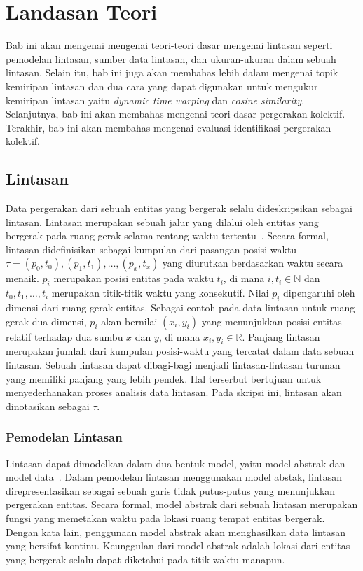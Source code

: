 \chapter{Landasan Teori}
\label{chap:teori}

Bab ini akan mengenai mengenai teori-teori dasar mengenai lintasan seperti pemodelan lintasan, sumber data lintasan, dan ukuran-ukuran dalam sebuah lintasan. Selain itu, bab ini juga akan membahas lebih dalam mengenai topik kemiripan lintasan dan dua cara yang dapat digunakan untuk mengukur kemiripan lintasan yaitu \textit{dynamic time warping} dan \textit{cosine similarity}. Selanjutnya, bab ini akan membahas mengenai teori dasar pergerakan kolektif. Terakhir, bab ini akan membahas mengenai evaluasi identifikasi pergerakan kolektif.

\section{Lintasan}
\label{sec:lintasan}

Data pergerakan dari sebuah entitas yang bergerak selalu dideskripsikan sebagai lintasan. Lintasan merupakan sebuah jalur yang dilalui oleh entitas yang bergerak pada ruang gerak selama rentang waktu tertentu~\cite{wiratma:trajectory}. Secara formal, lintasan didefinisikan sebagai kumpulan dari pasangan posisi-waktu $\tau = (p_0, t_0), (p_1, t_1), \ldots, (p_x, t_x)$ yang diurutkan berdasarkan waktu secara menaik. $p_i$ merupakan posisi entitas pada waktu $t_i$, di mana $i, t_i \in \mathbb{N}$ dan $t_0, t_1, \ldots, t_i$ merupakan titik-titik waktu yang konsekutif. Nilai $p_i$ dipengaruhi oleh dimensi dari ruang gerak entitas. Sebagai contoh pada data lintasan untuk ruang gerak dua dimensi, $p_i$ akan bernilai $(x_i, y_i)$ yang menunjukkan posisi entitas relatif terhadap dua sumbu $x$ dan $y$, di mana $x_i, y_i \in \mathbb{R}$. Panjang lintasan merupakan jumlah dari kumpulan posisi-waktu yang tercatat dalam data sebuah lintasan. Sebuah lintasan dapat dibagi-bagi menjadi lintasan-lintasan turunan yang memiliki panjang yang lebih pendek. Hal terserbut bertujuan untuk menyederhanakan proses analisis data lintasan. Pada skripsi ini, lintasan akan dinotasikan sebagai $\tau$.

\subsection{Pemodelan Lintasan}
\label{subsec:pemodelan}

Lintasan dapat dimodelkan dalam dua bentuk model, yaitu model abstrak dan model data~\cite{wiratma:trajectory}. Dalam pemodelan lintasan menggunakan model abstak, lintasan direpresentasikan sebagai sebuah garis tidak putus-putus yang menunjukkan pergerakan entitas. Secara formal, model abstrak dari sebuah lintasan merupakan fungsi yang memetakan waktu pada lokasi ruang tempat entitas bergerak. Dengan kata lain, penggunaan model abstrak akan menghasilkan data lintasan yang bersifat kontinu. Keunggulan dari model abstrak adalah lokasi dari entitas yang bergerak selalu dapat diketahui pada titik waktu manapun. 

